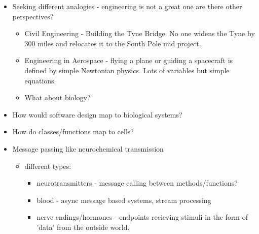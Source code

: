 \documentclass[11pt]{article}
\begin{document}
\begin{itemize}
\item Seeking different analogies - engineering is not a great one are there other perspectives?
\begin{itemize}
\item Civil Engineering - Building the Tyne Bridge. No one widens the Tyne by 300 miles and relocates it to the South Pole mid project.
\item Engineering in Aerospace - flying a plane or guiding a spacecraft is defined by simple Newtonian physics. Lots of variables but simple equations.
\item What about biology?
\end{itemize}
\item How would software design map to biological systems?
\item How do classes/functions map to cells?
\item Message passing like neurochemical transmission
\begin{itemize}
\item different types:
\begin{itemize}
\item neurotransmitters - message calling between methods/functions?
\item blood - async message based systems, stream processing
\item nerve endings/hormones - endpoints recieving stimuli in the form of 'data' from the outside world.
\end{itemize}
\end{itemize}


\end{itemize}
\end{document}

